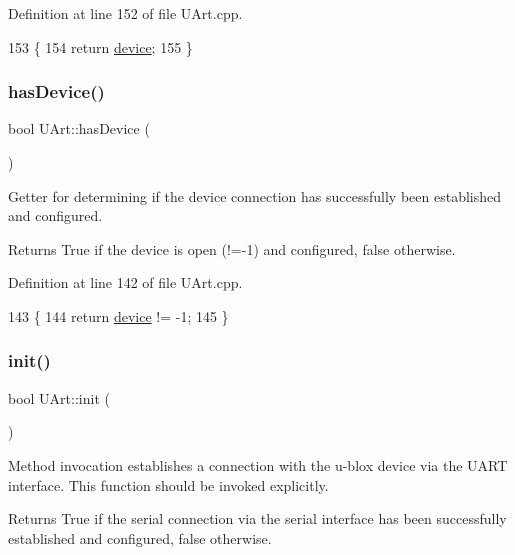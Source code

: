 Definition at line 152 of file U\+Art.\+cpp.


\begin{DoxyCode}
153 \{
154     \textcolor{keywordflow}{return} \hyperlink{class_u_art_a61fb55cc7c92c85f2219dffcfb58bc12}{device};
155 \}
\end{DoxyCode}
\mbox{\label{class_u_art_a40bc3c5d20a6c316004bab3ef45e6916}} 
\subsubsection{\texorpdfstring{has\+Device()}{hasDevice()}}
{\footnotesize\ttfamily bool U\+Art\+::has\+Device (\begin{DoxyParamCaption}{ }\end{DoxyParamCaption})}

Getter for determining if the device connection has successfully been established and configured.

\begin{DoxyReturn}{Returns}
True if the device is open (!=-\/1) and configured, false otherwise. 
\end{DoxyReturn}


Definition at line 142 of file U\+Art.\+cpp.


\begin{DoxyCode}
143 \{
144     \textcolor{keywordflow}{return} \hyperlink{class_u_art_a61fb55cc7c92c85f2219dffcfb58bc12}{device} != -1;
145 \}
\end{DoxyCode}
\mbox{\label{class_u_art_a51adaa81c08d92599768c0303e5abc94}} 
\subsubsection{\texorpdfstring{init()}{init()}}
{\footnotesize\ttfamily bool U\+Art\+::init (\begin{DoxyParamCaption}{ }\end{DoxyParamCaption})}

Method invocation establishes a connection with the u-\/blox device via the U\+A\+RT interface. This function should be invoked explicitly.

\begin{DoxyReturn}{Returns}
True if the serial connection via the serial interface has been successfully established and configured, false otherwise. 
\end{DoxyReturn}


